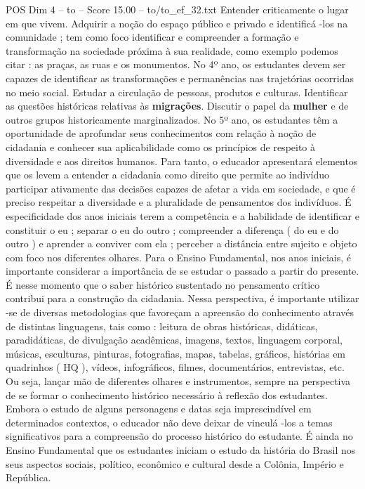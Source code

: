 \begin{textsample}{POS Dim 4 – to – Score 15.00 – to/to\_ef\_32.txt}
Entender criticamente o lugar em que vivem.
Adquirir a noção do espaço público e privado e identificá -los na comunidade ; tem como foco identificar e compreender a formação e transformação na sociedade próxima à sua realidade, como exemplo podemos citar : as praças, as ruas e os monumentos.
No 4º ano, os estudantes devem ser capazes de identificar as transformações e permanências nas trajetórias ocorridas no meio social.
Estudar a circulação de pessoas, produtos e culturas.
Identificar as questões históricas relativas às \textbf{migrações}.
Discutir o papel da \textbf{mulher} e de outros grupos historicamente marginalizados.
No 5º ano, os estudantes têm a oportunidade de aprofundar seus conhecimentos com relação à noção de cidadania e conhecer sua aplicabilidade como os princípios de respeito à diversidade e aos direitos humanos.
Para tanto, o educador apresentará elementos que os levem a entender a cidadania como direito que permite ao indivíduo participar ativamente das decisões capazes de afetar a vida em sociedade, e que é preciso respeitar a diversidade e a pluralidade de pensamentos dos indivíduos.
É especificidade dos anos iniciais terem a competência e a habilidade de identificar e constituir o eu ; separar o eu do outro ; compreender a diferença ( do eu e do outro ) e aprender a conviver com ela ; perceber a distância entre sujeito e objeto com foco nos diferentes olhares.
Para o Ensino Fundamental, nos anos iniciais, é importante considerar a importância de se estudar o passado a partir do presente.
É nesse momento que o saber histórico sustentado no pensamento crítico contribui para a construção da cidadania.
Nessa perspectiva, é importante utilizar -se de diversas metodologias que favoreçam a apreensão do conhecimento através de distintas linguagens, tais como : leitura de obras históricas, didáticas, paradidáticas, de divulgação acadêmicas, imagens, textos, linguagem corporal, músicas, esculturas, pinturas, fotografias, mapas, tabelas, gráficos, histórias em quadrinhos ( HQ ), vídeos, infográficos, filmes, documentários, entrevistas, etc.
Ou seja, lançar mão de diferentes olhares e instrumentos, sempre na perspectiva de se formar o conhecimento histórico necessário à reflexão dos estudantes.
Embora o estudo de alguns personagens e datas seja imprescindível em determinados contextos, o educador não deve deixar de vinculá -los a temas significativos para a compreensão do processo histórico do estudante.
É ainda no Ensino Fundamental que os estudantes iniciam o estudo da história do Brasil nos seus aspectos sociais, político, econômico e cultural desde a Colônia, Império e República.

\end{textsample}
